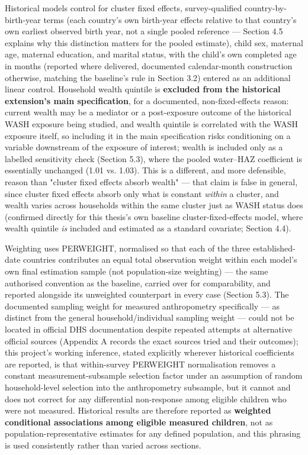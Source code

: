 Historical models control for cluster fixed effects, survey-qualified country-by-birth-year terms (each country's own birth-year effects relative to that country's own earliest observed birth year, not a single pooled reference --- Section 4.5 explains why this distinction matters for the pooled estimate), child sex, maternal age, maternal education, and marital status, with the child's own completed age in months (reported where delivered, documented calendar-month construction otherwise, matching the baseline's rule in Section 3.2) entered as an additional linear control. Household wealth quintile is \textbf{excluded from the historical extension's main specification}, for a documented, non-fixed-effects reason: current wealth may be a mediator or a post-exposure outcome of the historical WASH exposure being studied, and wealth quintile is correlated with the WASH exposure itself, so including it in the main specification risks conditioning on a variable downstream of the exposure of interest; wealth is included only as a labelled sensitivity check (Section 5.3), where the pooled water--HAZ coefficient is essentially unchanged (1.01 vs. 1.03). This is a different, and more defensible, reason than "cluster fixed effects absorb wealth" --- that claim is false in general, since cluster fixed effects absorb only what is constant \textit{within} a cluster, and wealth varies across households within the same cluster just as WASH status does (confirmed directly for this thesis's own baseline cluster-fixed-effects model, where wealth quintile \textit{is} included and estimated as a standard covariate; Section 4.4).

Weighting uses PERWEIGHT, normalised so that each of the three established-date countries contributes an equal total observation weight within each model's own final estimation sample (not population-size weighting) --- the same authorised convention as the baseline, carried over for comparability, and reported alongside its unweighted counterpart in every case (Section 5.3). The documented sampling weight for measured anthropometry specifically --- as distinct from the general household/individual sampling weight --- could not be located in official DHS documentation despite repeated attempts at alternative official sources (Appendix A records the exact sources tried and their outcomes); this project's working inference, stated explicitly wherever historical coefficients are reported, is that within-survey PERWEIGHT normalisation removes a constant measurement-subsample selection factor under an assumption of random household-level selection into the anthropometry subsample, but it cannot and does not correct for any differential non-response among eligible children who were not measured. Historical results are therefore reported as \textbf{weighted conditional associations among eligible measured children}, not as population-representative estimates for any defined population, and this phrasing is used consistently rather than varied across sections.

